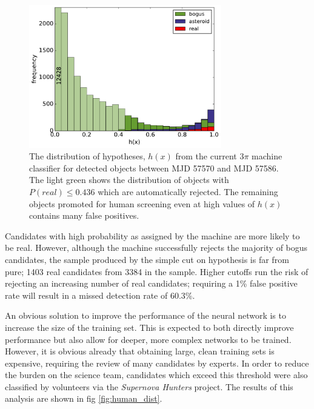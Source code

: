 \documentclass[a4paper,fleqn,usenatbib]{mnras}
\begin{document}
\begin{figure}
   \includegraphics[width=84mm]{figs/machine_hist.pdf}
   \caption{The distribution of hypotheses, $h(x)$ from the current 3$\pi$ machine classifier 
            for detected objects between MJD 57570 and MJD 57586.  The light green shows the distribution of 
            objects with $P(real) \leq 0.436$ which are automatically rejected.  The remaining 
            objects promoted for human screening even at high values of $h(x)$ contains
            many false positives.} 
   \label{fig:machine_dist} 
\end{figure}

Candidates with high probability as assigned by the machine are more likely to be real. However, although the machine successfully rejects the majority of bogus candidates, the sample produced by the simple cut on hypothesis is far from pure; 1403 real candidates from 3384 in the sample. Higher cutoffs run the risk of rejecting an increasing number of real candidates; requiring a 1\% false positive rate will result in a missed detection rate of 60.3\%. 

An obvious solution to improve the performance of the neural network is to increase the size of the training set. This is expected to both directly improve performance but also allow for deeper, more complex networks to be trained. However, it is obvious already that obtaining large, clean training sets is expensive, requiring the review of many candidates by experts. In order to reduce the burden on the science team, candidates which exceed this threshold were also classified by volunteers via the \emph{Supernova Hunters} project. The results of this analysis are shown in fig \ref{fig:human_dist}. 
\end{document}
